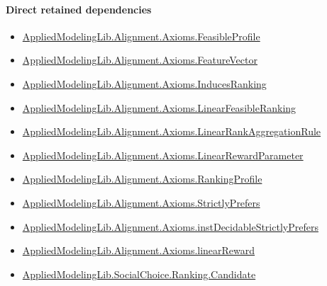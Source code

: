 \documentclass[10pt]{article}
\begin{document}
\paragraph{Direct retained dependencies}
\begin{itemize}\raggedright
\item \hyperlink{library-prerequisite-5fa7bdb49b050adf}{Applied\allowbreak{}Modeling\allowbreak{}Lib.\allowbreak{}Alignment.\allowbreak{}Axioms.\allowbreak{}Feasible\allowbreak{}Profile}
\item \hyperlink{library-prerequisite-a0b67c6a143b0b13}{Applied\allowbreak{}Modeling\allowbreak{}Lib.\allowbreak{}Alignment.\allowbreak{}Axioms.\allowbreak{}Feature\allowbreak{}Vector}
\item \hyperlink{library-prerequisite-b76a2acb4dafbb4d}{Applied\allowbreak{}Modeling\allowbreak{}Lib.\allowbreak{}Alignment.\allowbreak{}Axioms.\allowbreak{}Induces\allowbreak{}Ranking}
\item \hyperlink{library-prerequisite-3c30aae25bef2671}{Applied\allowbreak{}Modeling\allowbreak{}Lib.\allowbreak{}Alignment.\allowbreak{}Axioms.\allowbreak{}Linear\allowbreak{}Feasible\allowbreak{}Ranking}
\item \hyperlink{library-prerequisite-43447e121a1884f9}{Applied\allowbreak{}Modeling\allowbreak{}Lib.\allowbreak{}Alignment.\allowbreak{}Axioms.\allowbreak{}Linear\allowbreak{}Rank\allowbreak{}Aggregation\allowbreak{}Rule}
\item \hyperlink{library-prerequisite-d58203ca3f4a8c05}{Applied\allowbreak{}Modeling\allowbreak{}Lib.\allowbreak{}Alignment.\allowbreak{}Axioms.\allowbreak{}Linear\allowbreak{}Reward\allowbreak{}Parameter}
\item \hyperlink{library-prerequisite-9bded048a60dfe0a}{Applied\allowbreak{}Modeling\allowbreak{}Lib.\allowbreak{}Alignment.\allowbreak{}Axioms.\allowbreak{}Ranking\allowbreak{}Profile}
\item \hyperlink{library-prerequisite-191720c2353b55e9}{Applied\allowbreak{}Modeling\allowbreak{}Lib.\allowbreak{}Alignment.\allowbreak{}Axioms.\allowbreak{}Strictly\allowbreak{}Prefers}
\item \hyperlink{governing-declaration-b77c4838760c68c9}{Applied\allowbreak{}Modeling\allowbreak{}Lib.\allowbreak{}Alignment.\allowbreak{}Axioms.\allowbreak{}inst\allowbreak{}Decidable\allowbreak{}Strictly\allowbreak{}Prefers}
\item \hyperlink{library-prerequisite-4a32ddda17499d70}{Applied\allowbreak{}Modeling\allowbreak{}Lib.\allowbreak{}Alignment.\allowbreak{}Axioms.\allowbreak{}linear\allowbreak{}Reward}
\item \hyperlink{library-prerequisite-8c0e6c25845ae78a}{Applied\allowbreak{}Modeling\allowbreak{}Lib.\allowbreak{}Social\allowbreak{}Choice.\allowbreak{}Ranking.\allowbreak{}Candidate}
\end{itemize}
\end{document}
